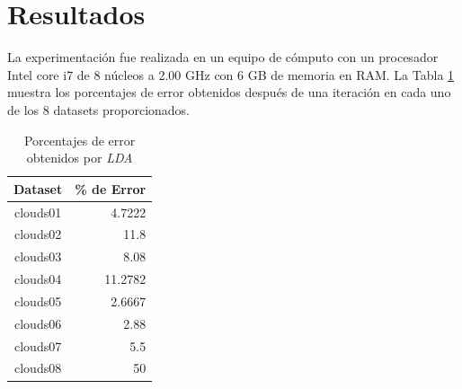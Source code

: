 \documentclass[journal]{IEEEtran}
\begin{document}
\section{Resultados} 
\label{sec:resultados}
La experimentación fue realizada en un equipo de cómputo con un procesador Intel core i7 de 8 núcleos a 2.00 GHz con 6 GB de memoria en RAM.
La Tabla \ref{tab:porcentajes-error} muestra los porcentajes de error obtenidos después de una iteración en cada uno de los 8 datasets proporcionados.

\begin{table}[h]
\centering
\caption{Porcentajes de error obtenidos por \emph{LDA}}
\label{tab:porcentajes-error}
\begin{tabular}{@{}cr@{}}
\toprule
\textbf{Dataset} & \multicolumn{1}{c}{\textbf{\% de Error}} \\ \midrule
clouds01         & 4.7222                                \\
clouds02         & 11.8                                  \\
clouds03         & 8.08                                  \\
clouds04         & 11.2782                               \\
clouds05         & 2.6667                                \\
clouds06         & 2.88                                  \\
clouds07         & 5.5                                   \\
clouds08         & 50                                    \\ \bottomrule
\end{tabular}

\end{table}
\end{document}
